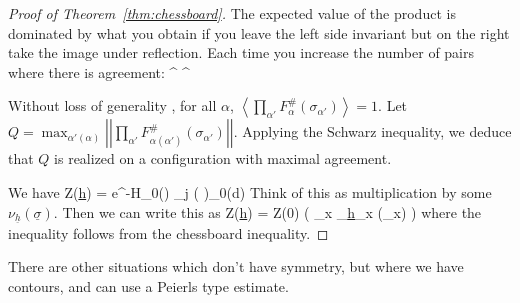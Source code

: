 \begin{proof}[Proof of Theorem~\ref{thm:chessboard}]

The expected value of the product is dominated by what you obtain if you leave the left side invariant but on the right take the image under reflection. Each time you increase the number of pairs where there is agreement:
\be
\left{}\right\rangle\le
\left{}\right\rangle^{} 
\left{}\right\rangle^{}
\ee

 Without loss of generality , for all $\alpha$, $\left\langle {\prod_{\alpha'} F_\alpha^{\#} (\sigma_{\alpha'})}\right\rangle=1$. Let $Q=\max_{\alpha'(\alpha)} \left| {\left| {\prod_{\alpha'} F^{\#}_{\alpha(\alpha')}(\sigma_{\alpha'})} \right|} \right|$.  Applying the Schwarz inequality, we deduce that $Q$ is realized on a configuration with maximal agreement.

We have 
\be
Z(\underline{h}) = \int e^{-\beta H_0(\sigma)} \prod_j \left( {} \right)\rho_0(d\sigma)
\ee
Think of this as multiplication by some $\nu_{\underline{h}}(\underline{\sigma})$. 
Then we can write this as 
\be
Z(\underline{h}) = Z(0) \left( {\prod_x \nu_{\underline{h}_x} (\underline{\sigma}_x)} \right) 
\ee
where the inequality follows from the chessboard inequality.
\end{proof}

There are other situations which don't have symmetry, but where we have contours, and can use a Peierls type estimate. 

